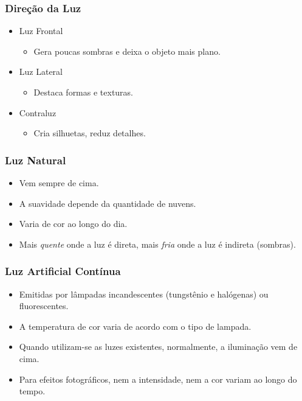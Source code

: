 

\begin{frame}
    \frametitle{Direção da Luz}
    \begin{itemize}
        \item Luz Frontal
        \begin{itemize}
            \item Gera poucas sombras e deixa o objeto mais plano.
        \end{itemize}
        \item Luz Lateral
        \begin{itemize}
            \item Destaca formas e texturas.
        \end{itemize}
        \item Contraluz
        \begin{itemize}
            \item Cria silhuetas, reduz detalhes.
        \end{itemize}
    \end{itemize}
\end{frame}





\begin{frame}
  \frametitle{Luz Natural}
  \begin{itemize}
      \item Vem sempre de cima.
      \item A suavidade depende da quantidade de nuvens.
      \item Varia de cor ao longo do dia.
      \item Mais \textit{quente} onde a luz é direta, mais \textit{fria} onde a
      luz é indireta (sombras).
  \end{itemize}
\end{frame}


\begin{frame}
  \frametitle{Luz Artificial Contínua}
  \begin{itemize}
      \item Emitidas por lâmpadas incandescentes (tungstênio e halógenas) ou fluorescentes.
      \item A temperatura de cor varia de acordo com o tipo de lampada.
      \item Quando utilizam-se as luzes existentes, normalmente, a iluminação vem de cima.
      \item Para efeitos fotográficos, nem a intensidade, nem a cor variam ao longo do tempo.
  \end{itemize}
\end{frame}


